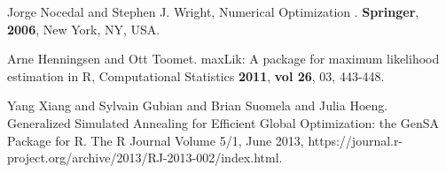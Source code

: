 \documentclass[journal,article,submit,moreauthors,pdftex]{Definitions/mdpi}
\begin{document}
\begin{thebibliography}{999}
Jorge Nocedal and Stephen J. Wright, Numerical Optimization . {\bf Springer}, {\bf 2006}, New York, NY, USA.


Arne Henningsen and Ott Toomet. maxLik: A package for maximum likelihood estimation in {R}, Computational Statistics {\bf 2011}, {\bf vol 26}, 03, 443-448.

Yang Xiang and Sylvain Gubian and Brian Suomela and Julia Hoeng. Generalized Simulated Annealing for Efficient Global Optimization: the {GenSA} Package for {R}. The R Journal Volume 5/1, June 2013, https://journal.r-project.org/archive/2013/RJ-2013-002/index.html.

 

\end{thebibliography}





\end{document}
